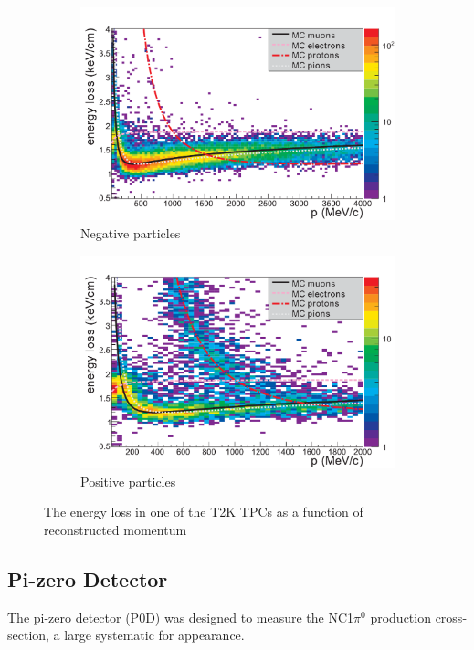 \begin{figure}[h]
	\begin{subfigure}[t]{0.47\textwidth}
		\includegraphics[width=\textwidth, trim={0mm 0mm 0mm 0mm}, clip,page=1]{figures/numu/TPC_PID_neg}
		\caption{Negative particles}
	\end{subfigure}
	\begin{subfigure}[t]{0.47\textwidth}
		\includegraphics[width=\textwidth, trim={0mm 0mm 0mm 0mm}, clip,page=1]{figures/numu/TPC_PID_pos}
		\caption{Positive particles}
	\end{subfigure}	
	\caption{The energy loss in one of the T2K TPCs as a function of reconstructed momentum}
	\label{fig:tpc_reco}
\end{figure}

\subsection{Pi-zero Detector}
The pi-zero detector (P0D)\cite{t2k_p0d} was designed to measure the NC1$\pi^0$ production cross-section, a large systematic for \nue appearance.

